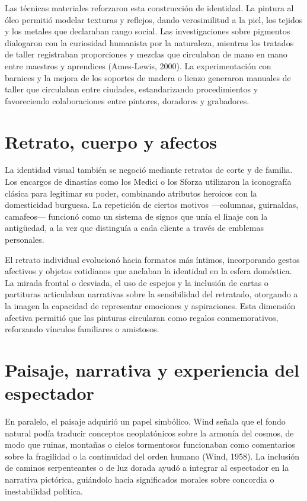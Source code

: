 Las técnicas materiales reforzaron esta construcción de identidad. La pintura al óleo permitió modelar texturas y reflejos, dando verosimilitud a la piel, los tejidos y los metales que declaraban rango social. Las investigaciones sobre pigmentos dialogaron con la curiosidad humanista por la naturaleza, mientras los tratados de taller registraban proporciones y mezclas que circulaban de mano en mano entre maestros y aprendices (Ames-Lewis, 2000). La experimentación con barnices y la mejora de los soportes de madera o lienzo generaron manuales de taller que circulaban entre ciudades, estandarizando procedimientos y favoreciendo colaboraciones entre pintores, doradores y grabadores.

\section{Retrato, cuerpo y afectos}
La identidad visual también se negoció mediante retratos de corte y de familia. Los encargos de dinastías como los Medici o los Sforza utilizaron la iconografía clásica para legitimar su poder, combinando atributos heroicos con la domesticidad burguesa. La repetición de ciertos motivos —columnas, guirnaldas, camafeos— funcionó como un sistema de signos que unía el linaje con la antigüedad, a la vez que distinguía a cada cliente a través de emblemas personales.

El retrato individual evolucionó hacia formatos más íntimos, incorporando gestos afectivos y objetos cotidianos que anclaban la identidad en la esfera doméstica. La mirada frontal o desviada, el uso de espejos y la inclusión de cartas o partituras articulaban narrativas sobre la sensibilidad del retratado, otorgando a la imagen la capacidad de representar emociones y aspiraciones. Esta dimensión afectiva permitió que las pinturas circularan como regalos conmemorativos, reforzando vínculos familiares o amistosos.

\section{Paisaje, narrativa y experiencia del espectador}
En paralelo, el paisaje adquirió un papel simbólico. Wind señala que el fondo natural podía traducir conceptos neoplatónicos sobre la armonía del cosmos, de modo que ruinas, montañas o cielos tormentosos funcionaban como comentarios sobre la fragilidad o la continuidad del orden humano (Wind, 1958). La inclusión de caminos serpenteantes o de luz dorada ayudó a integrar al espectador en la narrativa pictórica, guiándolo hacia significados morales sobre concordia o inestabilidad política.


